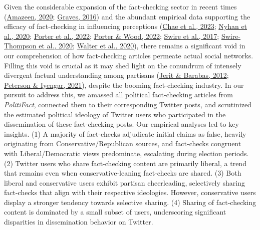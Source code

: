 \documentclass[
  12pt,
]{article}
\begin{document}
Given the considerable expansion of the fact-checking sector in recent
times (\protect\hyperlink{ref-amazeen2020journalistic}{Amazeen, 2020};
\protect\hyperlink{ref-graves2016}{Graves, 2016}) and the abundant
empirical data supporting the efficacy of fact-checking in influencing
perceptions (\protect\hyperlink{ref-chae2023perceiving}{Chae et al.,
2023}; \protect\hyperlink{ref-nyhan2020taking}{Nyhan et al., 2020};
\protect\hyperlink{ref-porter2022factual}{Porter et al., 2022};
\protect\hyperlink{ref-porter2022political}{Porter \& Wood, 2022};
\protect\hyperlink{ref-swire2017processing}{Swire et al., 2017};
\protect\hyperlink{ref-swire2020they}{Swire-Thompson et al., 2020};
\protect\hyperlink{ref-walter2020fact}{Walter et al., 2020}), there
remains a significant void in our comprehension of how fact-checking
articles permeate actual social networks. Filling this void is crucial
as it may shed light on the conundrum of intensely divergent factual
understanding among partisans
(\protect\hyperlink{ref-jerit2012partisan}{Jerit \& Barabas, 2012};
\protect\hyperlink{ref-peterson2021partisan}{Peterson \& Iyengar,
2021}), despite the booming fact-checking industry. In our pursuit to
address this, we amassed all political fact-checking articles from
\emph{PolitiFact}, connected them to their corresponding Twitter posts,
and scrutinized the estimated political ideology of Twitter users who
participated in the dissemination of these fact-checking posts. Our
empirical analyses led to key insights. (1) A majority of fact-checks
adjudicate initial claims as false, heavily originating from
Conservative/Republican sources, and fact-checks congruent with
Liberal/Democratic views predominate, escalating during election
periods. (2) Twitter users who share fact-checking content are primarily
liberal, a trend that remains even when conservative-leaning fact-checks
are shared. (3) Both liberal and conservative users exhibit partisan
cheerleading, selectively sharing fact-checks that align with their
respective ideologies. However, conservative users display a stronger
tendency towards selective sharing. (4) Sharing of fact-checking content
is dominated by a small subset of users, underscoring significant
disparities in dissemination behavior on Twitter.
\end{document}
